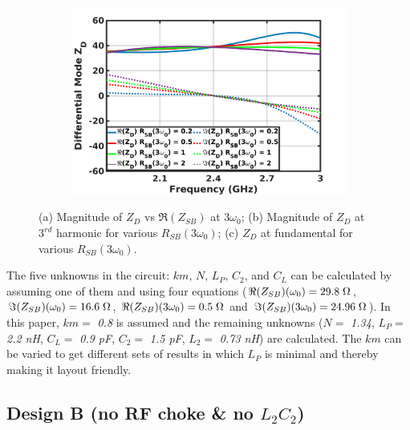 \documentclass[conference]{IEEEtran}
\begin{document}
\begin{figure}[!t]
\begin{subfigure}{0.4\textwidth}
\includegraphics[width=1\textwidth]{Images/Design/Design_A_Rn_var_1H.jpg}
\caption{}
\label{fig:Design_A_Rn_var_1H}
\end{subfigure}
\caption{(a) Magnitude of $Z_{D}$ vs $\Re(Z_{SB})$ at $3\omega_0$; (b) Magnitude of $Z_D$ at $3^{rd}$ harmonic for various $R_{SB}(3\omega_0)$; (c) $Z_D$ at fundamental for various $R_{SB}(3\omega_0)$.}
\label{fig:Design_A_Rn_var}
\vspace{-0.2in}
\end{figure}

The five unknowns in the circuit: $km$, $N$, $L_P$, $C_2$, and $C_L$ can be calculated by assuming one of them and using four equations ($\Re(Z_{SB})(\omega_0) =  29.8\hspace{1mm} \Omega$, $\Im(Z_{SB})(\omega_0) = 16.6\hspace{1mm}\Omega$, $\Re(Z_{SB})(3\omega_0) = 0.5\hspace{1mm}\Omega$ and  $\Im(Z_{SB})(3\omega_0) = 24.96\hspace{1mm}\Omega$). In this paper, $km =$ \textit{0.8} is assumed and the remaining unknowns ($N =$ \textit{1.34}, $L_P =$ \textit{2.2 nH}, $C_L =$ \textit{0.9 pF}, $C_2 =$ \textit{1.5 pF}, $L_2 =$ \textit{0.73 nH}) are calculated. The $km$ can be varied to get different sets of results in which $L_P$ is minimal and thereby making it layout friendly.


\subsection{Design B (no RF choke \& no $L_2C_2$)}
\end{document}
